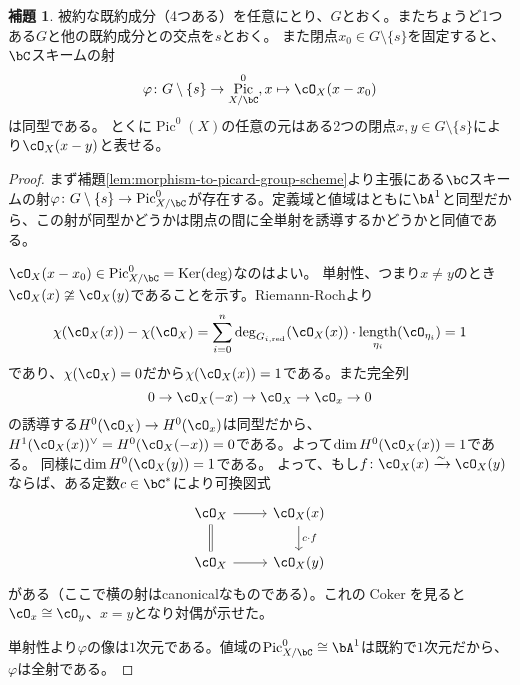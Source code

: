 \documentclass[uplatex, a4paper, dvipdfmx]{jsarticle}
\theoremstyle{definition}
\newtheorem{lemma}[theorem]{補題}
\DeclareMathOperator{\Pic}{\mathrm{Pic}}
\DeclareMathOperator{\Ker}{\mathrm{Ker}}
\DeclareMathOperator{\Coker}{\mathrm{Coker}}
\DeclareMathOperator{\red}{\mathrm{red}}
\DeclareMathOperator{\length}{\mathrm{length}}
\begin{document}
\begin{lemma}\label{lem:presentation-of-degree-zero-line-bundle}
    被約な既約成分（4つある）を任意にとり、$G$とおく。またちょうど1つある$G$と他の既約成分との交点を$s$とおく。
    また閉点$x_0 \in G\setminus \{s\}$を固定すると、
    $\bC$スキームの射
    \begin{equation}
        \varphi \colon G \setminus \{s\} \to \Pic^0_{X/\bC}, x \mapsto \cO_X(x - x_0)
    \end{equation}
    は同型である。
    とくに$\Pic^0(X)$の任意の元はある2つの閉点$x, y \in G \setminus\{s\}$により$\cO_X(x - y)$と表せる。
\end{lemma}
\begin{proof}
    まず補題\ref{lem:morphism-to-picard-group-scheme}より主張にある$\bC$スキームの射$\varphi \colon G \setminus \{s\} \to \Pic^0_{X/\bC}$が存在する。定義域と値域はともに$\bA^1$と同型だから、この射が同型かどうかは閉点の間に全単射を誘導するかどうかと同値である。

    $\cO_X(x - x_0) \in \Pic^0_{X/\bC} = \Ker(\deg)$なのはよい。
    単射性、つまり$x \neq y$のとき$\cO_X(x) \ncong \cO_X(y)$であることを示す。Riemann-Rochより
    \begin{equation}
        \chi(\cO_X(x)) - \chi(\cO_X) = \sum_{i = 0}^n \deg_{G_{i, \red}}(\cO_X(x))\cdot \length_{\eta_i}(\cO_{\eta_i}) = 1
    \end{equation}
    であり、$\chi(\cO_X) = 0$だから$\chi(\cO_X(x)) = 1$である。また完全列
    \begin{equation}
        0 \to \cO_X(-x) \to \cO_X \to \cO_x \to 0
    \end{equation}
    の誘導する$H^0(\cO_X) \to H^0(\cO_x)$は同型だから、$H^1(\cO_X(x))^\vee = H^0(\cO_X(-x)) = 0$である。よって$\dim H^0(\cO_X(x)) = 1$である。
    同様に$\dim H^0(\cO_X(y)) = 1$である。
    よって、もし$f \colon \cO_X(x) \xrightarrow{\sim} \cO_X(y)$ならば、ある定数$c \in \bC^*$により可換図式
    \[
        \begin{tikzcd}
            \cO_X \ar[r] \ar[d, equal] &\cO_X(x)\ar[d, "c \cdot f"]\\
            \cO_X \ar[r] &\cO_X(y)
        \end{tikzcd}
    \]
    がある（ここで横の射はcanonicalなものである）。これの$\Coker$を見ると$\cO_x \cong \cO_y$、$x = y$となり対偶が示せた。

    単射性より$\varphi$の像は$1$次元である。値域の$\Pic_{X/\bC}^0 \cong \bA^1$は既約で$1$次元だから、$\varphi$は全射である。
\end{proof}
\end{document}
